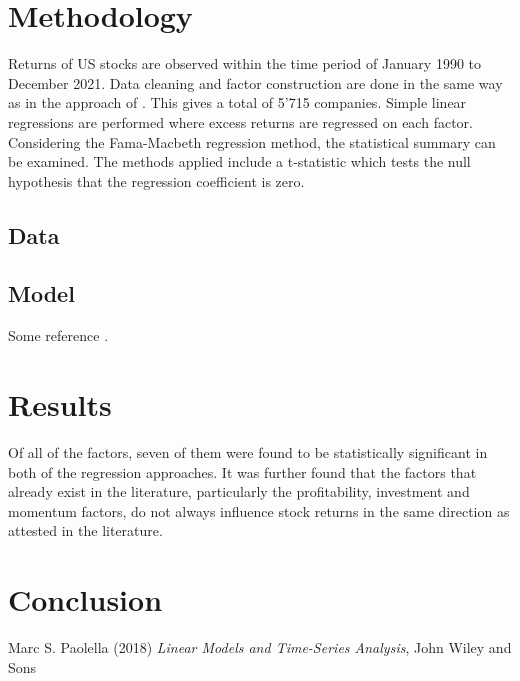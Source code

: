 \documentclass[12pt, a4paper]{article}%
\begin{document}
\section{Methodology} %
Returns of US stocks are observed within the time period of January 1990 to December 2021. Data cleaning and factor construction are done in the same way as in the approach of \textcite{FamaFrench2014}. This gives a total of 5'715 companies. Simple linear regressions are performed where excess returns are regressed on each factor. Considering the Fama-Macbeth regression method, the statistical summary can be examined. The methods applied include a t-statistic which tests the null hypothesis that the regression coefficient is zero. \\
\subsection{Data}

\subsection{Model}
Some reference \cite{Paolellalinear}.

\section{Results}
Of all of the factors, seven of them were found to be statistically significant in both of the regression approaches. It was further found that the factors that already exist in the literature, particularly the profitability, investment and momentum factors, do not always influence stock returns in the same direction as attested in the literature. %


\section{Conclusion} 



\begin{thebibliography}{1}

Marc S. Paolella (2018) \emph{Linear Models and Time-Series Analysis}, John Wiley and Sons

\end{thebibliography}
\end{document}
